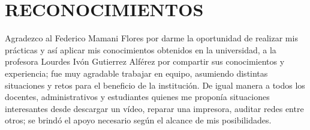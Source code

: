 \chapter*{RECONOCIMIENTOS}
\thispagestyle{empty}

Agradezco al Federico Mamani Flores por darme la oportunidad de realizar mis prácticas y así aplicar mis conocimientos obtenidos en la universidad, a la profesora Lourdes Ivón Gutierrez Alférez por compartir sus conocimientos y experiencia; fue muy agradable trabajar en equipo, asumiendo distintas situaciones y retos para el beneficio de la institución. De igual manera a todos los docentes, administrativos y estudiantes quienes me proponía situaciones interesantes desde descargar un vídeo, reparar una impresora, auditar redes entre otros; se brindó el apoyo necesario según el alcance de mis posibilidades.